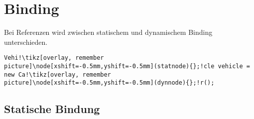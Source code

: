 \section{Binding}
Bei Referenzen wird zwischen statischem und dynamischem Binding unterschieden.
\begin{lstlisting}[numbers=none, 
    escapechar=!, 
    xleftmargin=-3mm, 
    linewidth=0.39\columnwidth,
    framexleftmargin=-3mm]
    Vehi!\tikz[overlay, remember picture]\node[xshift=-0.5mm,yshift=-0.5mm](statnode){};!cle vehicle = new Ca!\tikz[overlay, remember picture]\node[xshift=-0.5mm,yshift=-0.5mm](dynnode){};!r();
\end{lstlisting}

\subsection{Statische Bindung}
\vspace{-0.8\abovedisplayskip}
\begin{minipage}[t]{0.59\columnwidth}
    
\end{minipage}\hfill%
\begin{minipage}[t]{0.4\columnwidth}
    
\end{minipage}

